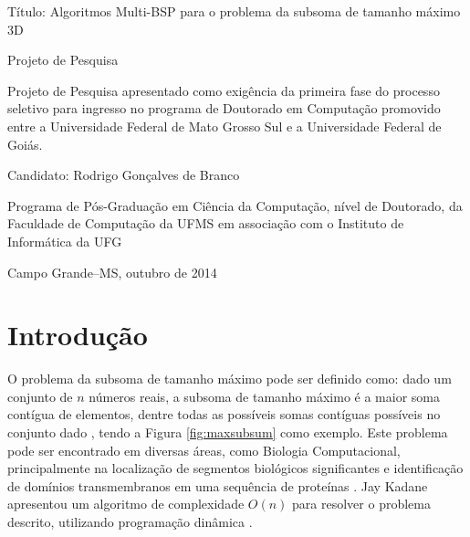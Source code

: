 \documentclass[a4paper, 12pt] {article}
\begin{document}
\thispagestyle{empty}
\begin{center}

\vskip 2.2cm

\Large{Título: Algoritmos Multi-BSP para o problema da subsoma de tamanho máximo
3D}

\vskip 1.5cm

\Large{Projeto de Pesquisa}

\vskip 1.5cm

\Large{Projeto de Pesquisa apresentado como exigência da primeira fase do
processo seletivo para ingresso no programa de Doutorado em Computação promovido entre a Universidade Federal de Mato Grosso Sul e a 
Universidade Federal de Goiás.}

\vskip 2.5cm

\Large{Candidato: Rodrigo Gonçalves de Branco}

\vskip 2.0cm


\vskip 2.5cm

\large{Programa de Pós-Graduação em Ciência da Computação, nível de Doutorado,
da Faculdade de Computação da UFMS em associação com o Instituto de Informática da UFG}

\vskip 1.3cm

Campo Grande--MS, outubro de 2014

\end{center}

\clearpage
\onehalfspacing

\section{Introdução}

O problema da subsoma de tamanho máximo pode ser definido como: dado um conjunto
de $n$ números reais, a subsoma de tamanho máximo é a maior soma contígua de
elementos, dentre todas as possíveis somas contíguas possíveis no conjunto
dado \cite{bentley2000programming}, tendo a Figura \ref{fig:maxsubsum} como
exemplo. Este problema pode ser encontrado em diversas áreas, como Biologia
Computacional, principalmente na localização de segmentos biológicos significantes e identificação de domínios
transmembranos em uma sequência de proteínas \cite{bae2007}. Jay Kadane
apresentou um algoritmo de complexidade $O(n)$ para resolver o problema descrito, utilizando 
programação dinâmica \cite{bentley2000programming}.
\end{document}
